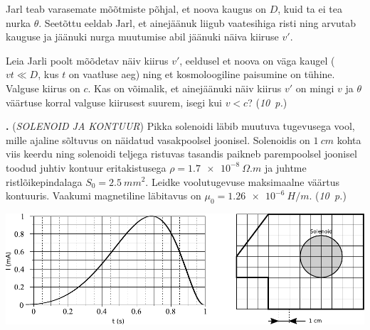 \documentclass[11pt,a5paper]{article}
\newcommand{\numb}[1]{\vspace{5pt}\textbf{\large #1}}
\newcommand{\nimi}[1]{(\textsl{\small #1})}
\newcommand{\punktid}[1]{(\emph{#1~p.})}
\newcommand{\autor}[1]{}
\newcounter{ylesanne}
\newcommand{\yl}[1]{\addtocounter{ylesanne}{1}\numb{\theylesanne.} \nimi{#1} \newblock{}}
\begin{document}
	Jarl teab varasemate mõõtmiste põhjal, et noova kaugus on $D$, kuid ta ei tea nurka $\theta$. Seetõttu eeldab Jarl, et ainejäänuk liigub vaatesihiga risti ning arvutab kauguse ja jäänuki nurga muutumise abil jäänuki näiva kiiruse $v'$.
	
	Leia Jarli poolt mõõdetav näiv kiirus $v'$, eeldusel et noova on väga kaugel ($vt \ll D$, kus $t$ on vaatluse aeg) ning et kosmoloogiline paisumine on tühine. Valguse kiirus on $c$. Kas on võimalik, et ainejäänuki näiv kiirus $v'$ on mingi $v$ ja $\theta$ väärtuse korral valguse kiirusest suurem, isegi kui $v < c$?
	\punktid{10} \autor{Richard Luhtaru}
	
	
	\yl{SOLENOID JA KONTUUR}
	Pikka solenoidi läbib muutuva tugevusega vool, mille ajaline sõltuvus on näidatud vasakpoolsel joonisel. Solenoidis on $\SI{1}{cm}$ kohta viis keerdu ning solenoidi teljega ristuvas tasandis paikneb parempoolsel joonisel toodud juhtiv kontuur
	eritakistusega $\rho=\SI{1,7e-8}{\Omega.m}$ ja juhtme ristlõikepindalaga $S_0=\SI{2,5}{mm^2}$. Leidke voolutugevuse maksimaalne väärtus kontuuris. Vaakumi magnetiline läbitavus on $\mu_0=\SI{1.26e-6}{H/m}$.
	\punktid{10} \autor{Päivo Simson}
	
	\begin{center}
		\includegraphics[width=1\linewidth]{induktsioon_joonis.pdf}
	\end{center}


	\newpage
	
\end{document}
